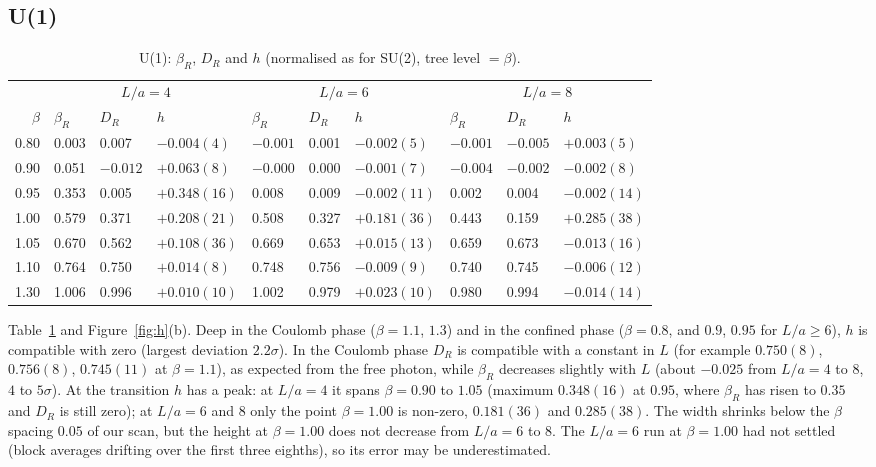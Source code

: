 \documentclass[11pt,a4paper]{article}
\theoremstyle{definition}
\theoremstyle{remark}
\newcommand{\bR}{\beta_R}
\newcommand{\DR}{D_R}
\begin{document}
\subsection{U(1)}

\begin{table}[ht]\centering\small
\caption{U(1): $\bR$, $\DR$ and $h$ (normalised as for SU(2), tree level $=\beta$).}\label{tab:u1}
\begin{tabular}{@{}rlllllllll@{}}\toprule
 & \multicolumn{3}{c}{$L/a=4$} & \multicolumn{3}{c}{$L/a=6$} & \multicolumn{3}{c}{$L/a=8$}\\
$\beta$ & $\bR$ & $\DR$ & $h$ & $\bR$ & $\DR$ & $h$ & $\bR$ & $\DR$ & $h$\\\midrule
0.80 & 0.003 & 0.007 & $-0.004(4)$ & $-0.001$ & 0.001 & $-0.002(5)$ & $-0.001$ & $-0.005$ & $+0.003(5)$\\
0.90 & 0.051 & $-0.012$ & $+0.063(8)$ & $-0.000$ & 0.000 & $-0.001(7)$ & $-0.004$ & $-0.002$ & $-0.002(8)$\\
0.95 & 0.353 & 0.005 & $+0.348(16)$ & 0.008 & 0.009 & $-0.002(11)$ & 0.002 & 0.004 & $-0.002(14)$\\
1.00 & 0.579 & 0.371 & $+0.208(21)$ & 0.508 & 0.327 & $+0.181(36)$ & 0.443 & 0.159 & $+0.285(38)$\\
1.05 & 0.670 & 0.562 & $+0.108(36)$ & 0.669 & 0.653 & $+0.015(13)$ & 0.659 & 0.673 & $-0.013(16)$\\
1.10 & 0.764 & 0.750 & $+0.014(8)$ & 0.748 & 0.756 & $-0.009(9)$ & 0.740 & 0.745 & $-0.006(12)$\\
1.30 & 1.006 & 0.996 & $+0.010(10)$ & 1.002 & 0.979 & $+0.023(10)$ & 0.980 & 0.994 & $-0.014(14)$\\\bottomrule
\end{tabular}
\end{table}

Table~\ref{tab:u1} and Figure~\ref{fig:h}(b). Deep in the Coulomb phase ($\beta=1.1$, $1.3$) and in the confined phase ($\beta=0.8$, and $0.9$, $0.95$ for $L/a\ge6$), $h$ is compatible with zero (largest deviation $2.2\sigma$). In the Coulomb phase $\DR$ is compatible with a constant in $L$ (for example $0.750(8)$, $0.756(8)$, $0.745(11)$ at $\beta=1.1$), as expected from the free photon, while $\bR$ decreases slightly with $L$ (about $-0.025$ from $L/a=4$ to $8$, $4$ to $5\sigma$). At the transition $h$ has a peak: at $L/a=4$ it spans $\beta=0.90$ to $1.05$ (maximum $0.348(16)$ at $0.95$, where $\bR$ has risen to $0.35$ and $\DR$ is still zero); at $L/a=6$ and $8$ only the point $\beta=1.00$ is non-zero, $0.181(36)$ and $0.285(38)$. The width shrinks below the $\beta$ spacing $0.05$ of our scan, but the height at $\beta=1.00$ does not decrease from $L/a=6$ to $8$. The $L/a=6$ run at $\beta=1.00$ had not settled (block averages drifting over the first three eighths), so its error may be underestimated.
\end{document}
